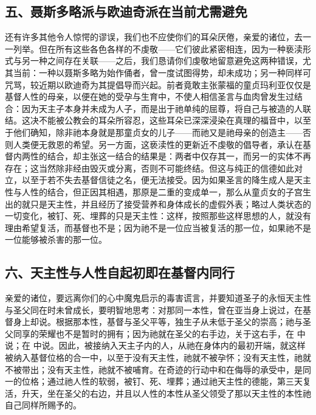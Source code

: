 
\subsection{五、聂斯多略派与欧迪奇派在当前尤需避免}

还有许多其他令人惊愕的谬误，我们也不应使你们的耳朵厌倦，亲爱的诸位，去一一列举。但在所有这些各色各样的不虔敬——它们彼此紧密相连，因为一种亵渎形式与另一种之间存在关联——之后，我们恳请你们虔敬地留意避免这两种错误，尤其当前：一种以聂斯多略为始作俑者，曾一度试图得势，却未成功；另一种同样可咒骂，较近期以欧迪奇为其提倡导而兴起。前者竟敢主张蒙福的童贞玛利亚仅仅是基督人性的母亲，以便在她的受孕与生育中，不使人相信圣言与血肉曾发生过结合：因为天主子本身并未成为人子，而是出于祂单纯的屈尊，将自己与被造的人联结。这决不能被公教会的耳朵所容忍，这些耳朵已深深浸染在真理的福音中，以至于他们确知，除非祂本身就是那童贞女的儿子——而祂又是祂母亲的创造主——否则人类便无救恩的希望。另一方面，这亵渎性的更新近不虔敬的倡导者，承认在基督内两性的结合，却主张这一结合的结果是：两者中仅存其一，而另一的实体不再存在；这当然除非经由毁灭或分离，否则不可能终结。但这与纯正的信德如此对立，以至于若不失去基督信徒之名，便无法接受。因为如果圣言的降生成人是天主性与人性的结合，但正因其相遇，那原是二重的变成单一，那么从童贞女的子宫生出的就只是天主性，并且经历了接受营养和身体成长的虚假外表；略过人类状态的一切变化，被钉、死、埋葬的只是天主性：这样，按照那些这样思想的人，就没有理由希望复活，而基督也不是；因为祂不是一位应当被复活的那一位，如果祂不是一位能够被杀害的那一位。\par


\subsection{六、天主性与人性自起初即在基督内同行}

亲爱的诸位，要远离你们的心中魔鬼启示的毒害谎言，并要知道圣子的永恒天主性与圣父同在时未曾成长，要明智地思考：对那同一本性，曾在亚当身上说过，在基督身上却说。根据那本性，基督与圣父平等，独生子从未低于圣父的崇高；祂与圣父同享的荣耀也不是暂时的拥有；因为祂就在圣父的右手边，关于这右手，在  中说；在  中说。因此，被接纳入天主子内的人，从祂在身体内的最初开端，就这样被纳入基督位格的合一中，以至于没有天主性，祂就不被孕怀；没有天主性，祂就不被带出；没有天主性，祂就不被哺育。在奇迹的行动中和在侮辱的承受中，是同一的位格；通过祂人性的软弱，被钉、死、埋葬；通过祂天主性的德能，第三天复活，升天，坐在圣父的右边，并且以人性的本性从圣父领受了那以天主性的本性祂自己同样所赐予的。\par

